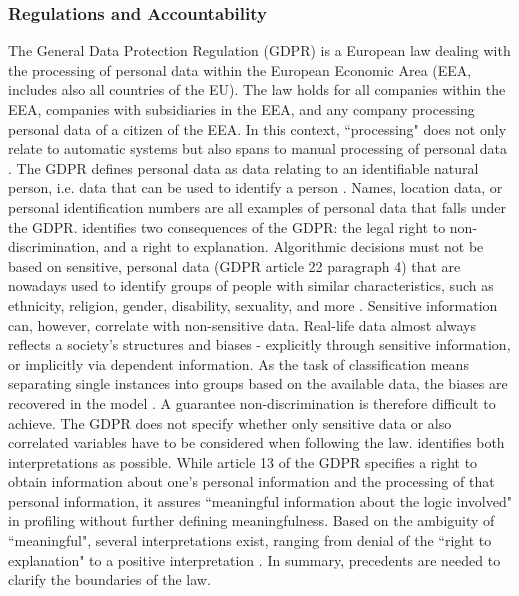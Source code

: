 \subsubsection{Regulations and Accountability}
The General Data Protection Regulation (GDPR) is a European law dealing with the processing of personal data within the European Economic Area (EEA, includes also all countries of the EU). The law holds for all companies within the EEA, companies with subsidiaries in the EEA, and any company processing personal data of a citizen of the EEA. In this context, ``processing" does not only relate to automatic systems but also spans to manual processing of personal data \cite{goodman16eu}. The GDPR defines personal data as data relating to an identifiable natural person, i.e. data that can be used to identify a person \cite{council2001common}. Names, location data, or personal identification numbers are all examples of personal data that falls under the GDPR. \cite{goodman16eu} identifies two consequences of the GDPR: the legal right to non-discrimination, and a right to explanation.\newline
Algorithmic decisions must not be based on sensitive, personal data (GDPR article 22 paragraph 4) that are nowadays used to identify groups of people with similar characteristics, such as ethnicity, religion, gender, disability, sexuality, and more \cite{diakopoulos2016accountability}. Sensitive information can, however, correlate with non-sensitive data. Real-life data almost always reflects a society's structures and biases - explicitly through sensitive information, or implicitly via dependent information. As the task of classification means separating single instances into groups based on the available data, the biases are recovered in the model \cite{goodman16eu}. A guarantee non-discrimination is therefore difficult to achieve. The GDPR does not specify whether only sensitive data or also correlated variables have to be considered when following the law. \cite{goodman16eu} identifies both interpretations as possible.\newline
While article 13 of the GDPR specifies a right to obtain information about one's personal information and the processing of that personal information, it assures ``meaningful information about the logic involved" in profiling without further defining meaningfulness. Based on the ambiguity of ``meaningful", several interpretations exist, ranging from denial of the ``right to explanation" \cite{wachter2017right} to a positive interpretation \cite{selbst2017meaningful}. In summary, precedents are needed to clarify the boundaries of the law.\newline
